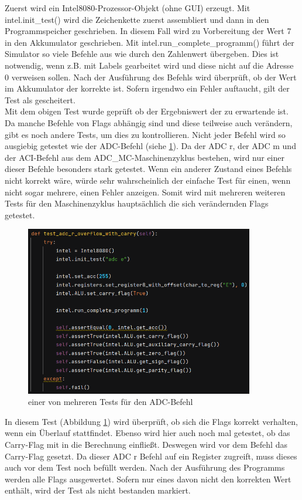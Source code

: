 \documentclass[12pt]{article}
\newcommand{\imgSpaceBefore}{\vspace{10pt}}
\begin{document}
\noindent
Zuerst wird ein Intel8080-Prozessor-Objekt (ohne GUI) erzeugt. Mit intel.init\_test() wird die Zeichenkette zuerst assembliert und dann in den Programmspeicher geschrieben. In diesem Fall wird zu Vorbereitung der Wert 7 in den Akkumulator geschrieben. Mit intel.run\_complete\_programm() führt der Simulator so viele Befehle aus wie durch den Zahlenwert übergeben. Dies ist notwendig, wenn z.B. mit Labels gearbeitet wird und diese nicht auf die Adresse 0 verweisen sollen. Nach der Ausführung des Befehls wird überprüft, ob der Wert im Akkumulator der korrekte ist. Sofern irgendwo ein Fehler auftaucht, gilt der Test als gescheitert.
\\

\noindent
Mit dem obigen Test wurde geprüft ob der Ergebniswert der zu erwartende ist. Da manche Befehle  von Flags abhängig sind und diese teilweise auch verändern, gibt es noch andere Tests, um dies zu kontrollieren. Nicht jeder Befehl wird so ausgiebig getestet wie der ADC-Befehl (siehe \ref{fig:test_adc}). Da der ADC r, der ADC m und der ACI-Befehl aus dem ADC\_MC-Maschinenzyklus bestehen, wird nur einer dieser Befehle besonders stark getestet. Wenn ein anderer Zustand eines Befehls nicht korrekt wäre, würde sehr wahrscheinlich der einfache Test für einen, wenn nicht sogar mehrere, einen Fehler anzeigen. Somit wird mit mehreren weiteren Tests für den Maschinenzyklus hauptsächlich die sich verändernden Flags getestet.

\imgSpaceBefore
\begin{figure}[H]
\centering
\includegraphics[width=10cm]{bilder/test_adc}
\caption{einer von mehreren Tests für den ADC-Befehl}
\label{fig:test_adc}
\end{figure}

\noindent
In diesem Test (Abbildung \ref{fig:test_adc}) wird überprüft, ob sich die Flags korrekt verhalten, wenn ein Überlauf stattfindet. Ebenso wird hier auch noch mal getestet, ob das Carry-Flag mit in die Berechnung einfließt. Deswegen wird vor dem Befehl das Carry-Flag gesetzt. Da dieser ADC r Befehl auf ein Register zugreift, muss dieses auch vor dem Test noch befüllt werden. Nach der Ausführung des Programms werden alle Flags ausgewertet. Sofern nur eines davon nicht den korrekten Wert enthält, wird der Test als nicht bestanden markiert.
\end{document}
